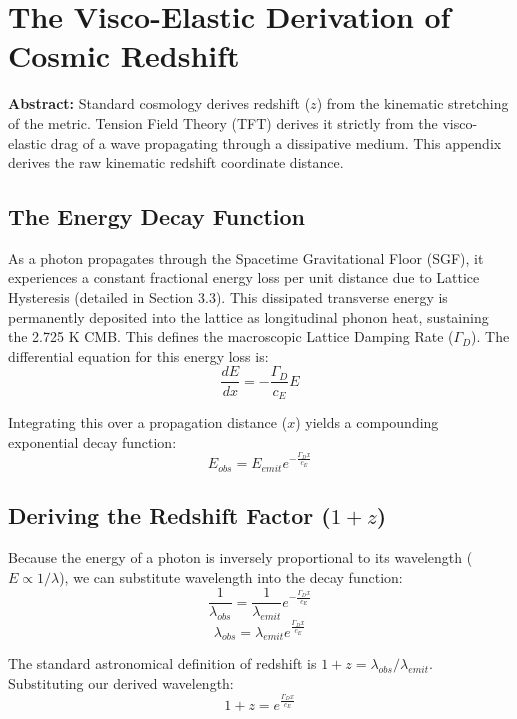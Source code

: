 \chapter{The Visco-Elastic Derivation of Cosmic Redshift}
\label{app:cosmic_redshift}

\textbf{Abstract:} Standard cosmology derives redshift ($z$) from the kinematic stretching of the metric. Tension Field Theory (TFT) derives it strictly from the visco-elastic drag of a wave propagating through a dissipative medium. This appendix derives the raw kinematic redshift coordinate distance.

\section{The Energy Decay Function}
As a photon propagates through the Spacetime Gravitational Floor (SGF), it experiences a constant fractional energy loss per unit distance due to Lattice Hysteresis (detailed in Section 3.3). This dissipated transverse energy is permanently deposited into the lattice as longitudinal phonon heat, sustaining the 2.725 K CMB. This defines the macroscopic Lattice Damping Rate ($\Gamma_D$). The differential equation for this energy loss is:
\begin{equation}
    \frac{dE}{dx} = -\frac{\Gamma_D}{c_E} E
\end{equation}

Integrating this over a propagation distance ($x$) yields a compounding exponential decay function:
\begin{equation}
    E_{obs} = E_{emit} e^{-\frac{\Gamma_D x}{c_E}}
\end{equation}

\section{Deriving the Redshift Factor ($1+z$)}
Because the energy of a photon is inversely proportional to its wavelength ($E \propto 1/\lambda$), we can substitute wavelength into the decay function:
\begin{equation}
    \frac{1}{\lambda_{obs}} = \frac{1}{\lambda_{emit}} e^{-\frac{\Gamma_D x}{c_E}}
\end{equation}
\begin{equation}
    \lambda_{obs} = \lambda_{emit} e^{\frac{\Gamma_D x}{c_E}}
\end{equation}

The standard astronomical definition of redshift is $1+z = \lambda_{obs}/\lambda_{emit}$. Substituting our derived wavelength:
\begin{equation}
    1+z = e^{\frac{\Gamma_D x}{c_E}}
\end{equation}

